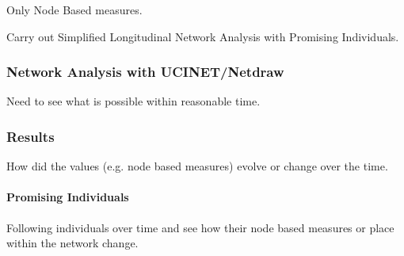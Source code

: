 Only Node Based measures.

Carry out Simplified Longitudinal Network Analysis with Promising Individuals.

\subsubsection{Network Analysis with UCINET/Netdraw}
\label{subsubsec:netanucinet}

Need to see what is possible within reasonable time.

\subsubsection{Results}
\label{subsubsec:netanres}

How did the values (e.g. node based measures) evolve or change over the time.

\label{paragraph:simlonnet}
\paragraph{ Promising Individuals}
Following individuals over time and see how their node based measures or place within the network change.